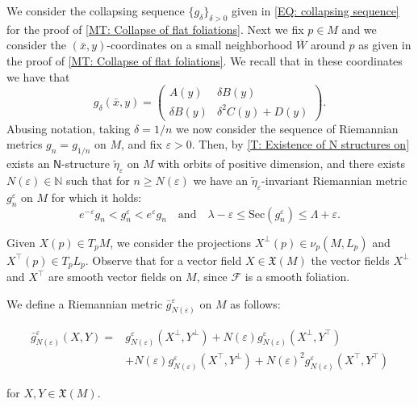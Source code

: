 \documentclass[12pt,a4paper,reqno]{amsart}
\theoremstyle{definition}
\numberwithin{equation}{section}
\newcommand{\fol}{\mathcal{F}}
\newcommand{\N}{\mathbb{N}} %
\newcommand{\Ns}{\mathsf{N}}
\newcommand{\Sec}{\mathrm{Sec}}
\newcommand{\X}{\mathfrak{X}}
\begin{document}
We consider the collapsing sequence $\{g_\delta\}_{\delta>0}$ given in \eqref{EQ: collapsing sequence} for the proof of \th\ref{MT: Collapse of flat foliations}. Next we fix $p\in M$ and we consider the $(\bar{x},y)$-coordinates  on a small neighborhood $\overline{W}$ around $p$ as given  in the proof of \th\ref{MT: Collapse of flat foliations}. We recall that in these coordinates we have that 
\[
g_\delta(\bar{x},y) = \begin{pmatrix}
A(y) & \delta B(y)\\
\delta B(y) & \delta^2 C(y)+D(y)
\end{pmatrix}.
\]
Abusing notation, taking $\delta=1/n$ we now consider the sequence of Riemannian metrics $g_n = g_{1/n}$ on $M$, and  fix $\varepsilon>0$. Then, by \th\ref{T: Existence of N structures on} exists an $\Ns$-structure  $\widetilde{\eta}_\varepsilon$ on $M$ with orbits of positive dimension, and there exists $N(\varepsilon)\in \N$  such that for $n\geq N(\varepsilon)$ we have an $\widetilde{\eta}_\varepsilon$-invariant Riemannian metric  $g_n^\varepsilon$ on $M$  for which it holds:
\begin{equation}\label{EQ: Equivalence between g and gvarepsilon}
e^{-\varepsilon} g_n < g^\varepsilon_{n} < e^{\varepsilon} g_n\quad\mbox{and}\quad 	 \lambda-\varepsilon \leq \Sec(g^\varepsilon_n) \leq \Lambda+\varepsilon.
\end{equation}



Given $X(p)\in T_pM$, we consider the projections $X^\perp(p)\in \nu_p(M,L_p)$ and $X^\top(p)\in T_pL_p$. Observe that for a vector field $X\in \X(M)$ the vector fields $X^\perp$ and $X^\top$ are smooth vector fields on $M$, since $\fol$ is a smooth foliation.

We define a Riemannian metric $\bar{g}^\varepsilon_{N(\varepsilon)}$ on $M$ as follows:
\begin{linenomath}
\begin{equation}\label{EQ: modifed N_e metric}
\begin{split}
\bar{g}^\varepsilon_{N(\varepsilon)}(X,Y) =& g^\varepsilon_{N(\varepsilon)}(X^\perp,Y^\perp)+N(\varepsilon) g^\varepsilon_{N(\varepsilon)}(X^\perp,Y^\top)\\
&+N(\varepsilon) g^\varepsilon_{N(\varepsilon)}(X^\top,Y^\perp)+ N(\varepsilon)^2 g^\varepsilon_{N(\varepsilon)}(X^\top,Y^\top)
\end{split}
\end{equation}
\end{linenomath}
for $X,Y\in \X(M)$. 
\end{document}

